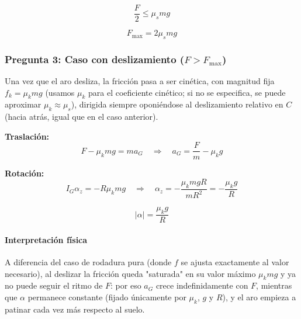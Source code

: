 \begin{sol}
$$\frac{F}{2} \leq \mu_s mg$$

$$\boxed{F_{\text{max}} = 2\mu_s mg}$$

\subsubsection*{Pregunta 3: Caso con deslizamiento ($F > F_{\text{max}}$)}

Una vez que el aro desliza, la fricción pasa a ser cinética, con magnitud fija $f_k = \mu_k mg$ (usamos $\mu_k$ para el coeficiente cinético; si no se especifica, se puede aproximar $\mu_k \approx \mu_s$), dirigida siempre oponiéndose al deslizamiento relativo en $C$ (hacia atrás, igual que en el caso anterior).

\textbf{Traslación:}
$$F - \mu_k mg = ma_G \quad\Rightarrow\quad \boxed{a_G = \frac{F}{m} - \mu_k g}$$

\textbf{Rotación:}
$$I_G\alpha_z = -R\mu_k mg \quad\Rightarrow\quad \alpha_z = -\frac{\mu_k mgR}{mR^2} = -\frac{\mu_k g}{R}$$

$$\boxed{|\alpha| = \frac{\mu_k g}{R}}$$

\paragraph{Interpretación física} A diferencia del caso de rodadura pura (donde $f$ se ajusta exactamente al valor necesario), al deslizar la fricción queda "saturada" en su valor máximo $\mu_k mg$ y ya no puede seguir el ritmo de $F$: por eso $a_G$ crece indefinidamente con $F$, mientras que $\alpha$ permanece constante (fijado únicamente por $\mu_k$, $g$ y $R$), y el aro empieza a patinar cada vez más respecto al suelo.

\end{sol}
